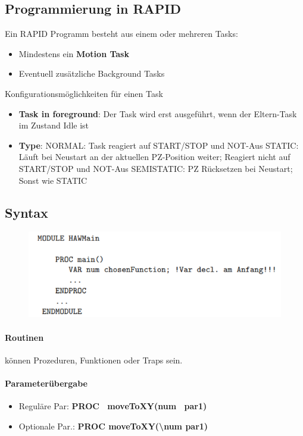 \subsection{Programmierung in RAPID}
Ein RAPID Programm besteht aus einem oder mehreren Tasks:
\begin{itemize}
	\item Mindestens ein \textbf{Motion Task}
	\item Eventuell zusätzliche Background Tasks
\end{itemize}
Konfigurationsmöglichkeiten für einen Task
\begin{itemize}
	\item \textbf{Task in foreground}: Der Task wird erst ausgeführt, wenn der Eltern-Task im Zustand Idle ist
	\item \textbf{Type}:
	\subitem NORMAL: Task reagiert auf START/STOP und NOT-Aus
	\subitem STATIC: Läuft bei Neustart an der aktuellen PZ-Position weiter; Reagiert nicht auf START/STOP und NOT-Aus
	\subitem SEMISTATIC: PZ Rücksetzen bei Neustart; Sonst wie STATIC
\end{itemize}
\subsection{Syntax}
\begin{figure}[H]
	\begin{center}
		\includegraphics[scale=0.8]{Resources/PNG/Syntax1.PNG}
		\caption{}
		\label{fig:PNG/Syntax1.PNG}
	\end{center}
\end{figure}
\paragraph{Routinen}
können Prozeduren, Funktionen oder Traps sein.
\paragraph{Parameterübergabe}
\begin{itemize}
	\item Reguläre Par: \textbf{PROC \ moveToXY(num \ par1)}
	\item Optionale Par.: \textbf{PROC moveToXY(\backslash num par1)}
\end{itemize}
